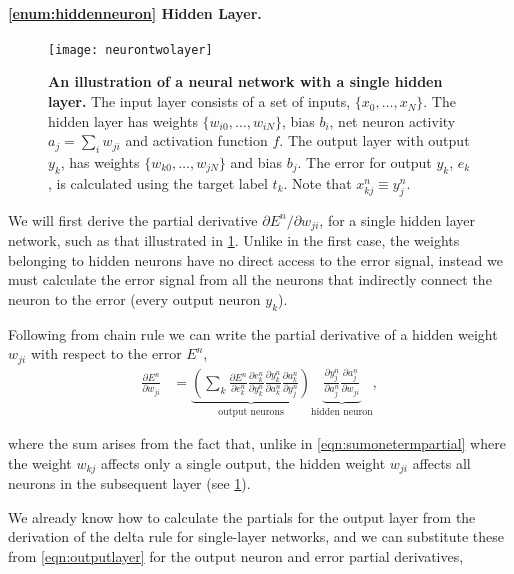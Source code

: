 \documentclass[thesis]{subfiles}
\begin{document}
\paragraph{\ref{enum:hiddenneuron} Hidden Layer.}
\begin{figure}[tbp]
\centering
\texttt{[image: neurontwolayer]}
\caption[An illustration of a neural network with a single hidden layer]{\textbf{An illustration of a neural network with a single hidden layer.} The input layer consists of a set of inputs, $\{x_{0}, \ldots, x_{N}\}$. The hidden layer has weights $\{w_{i0}, \ldots, w_{iN}\}$, bias $b_i$, net neuron activity $a_j = \sum_i w_{ji}$ and activation function $f$. The output layer with output $y_k$, has weights $\{w_{k0}, \ldots, w_{jN}\}$ and bias $b_j$. The error for output $y_k$, $e_k$, is calculated using the target label $t_k$. Note that $x^n_{kj} \equiv y^n	_j$.}
\label{fig:neurontwolayer}
\end{figure}
We will first derive the partial derivative ${\partial E^n}/{\partial w_{ji}}$, for a single hidden layer network, such as that illustrated in \cref{fig:neurontwolayer}. Unlike in the first case, the weights belonging to hidden neurons have no direct access to the error signal, instead we must calculate the error signal from all the neurons that indirectly connect the neuron to the error (\ie{}every output neuron $y_k$).

Following from chain rule we can write the partial derivative of a hidden weight $w_{ji}$ with respect to the error $E^n$,
\begin{equation}
\begin{aligned}
    \frac{\partial E^n}{\partial w_{ji}} &= \underbrace{\left( \sum_k \frac{\partial E^n}{\partial e^n_{k}}
     \frac{\partial e^n_{k}}{\partial y^n_{k}} \frac{\partial y^n_{k}}{\partial a^n_k} \frac{\partial a^n_k}{\partial y^n_{j}}\right)}_\text{output neurons}
     \underbrace{\frac{\partial y^n_{j}}{\partial a^n_{j}} \frac{\partial a^n_{j}}{\partial w_{ji}}}_\text{hidden neuron},
     \label{eqn:twolayer1}
\end{aligned}
\end{equation}

where the sum arises from the fact that, unlike in \cref{eqn:sumonetermpartial} where the weight $w_{kj}$ affects only a single output, the hidden weight $w_{ji}$ affects all neurons in the subsequent layer (see \cref{fig:neurontwolayer}).

We already know how to calculate the partials for the output layer from the derivation of the delta rule for single-layer networks, and we can substitute these from \cref{eqn:outputlayer} for the output neuron and error partial derivatives,
\end{document}
